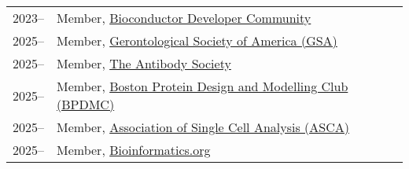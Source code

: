 \begin{longtable}[l]{@{}p{} p{}}

    2023-- & Member, \href{https://www.bioconductor.org/developers/}{Bioconductor Developer Community} \\

    2025-- & Member, \href{https://www.geron.org}{Gerontological Society of America (GSA)} \\

    2025-- & Member, \href{https://www.antibodysociety.org/}{The Antibody Society} \\

    2025-- & Member, \href{https://www.bpdmc.org/}{Boston Protein Design and Modelling Club (BPDMC)} \\

    2025-- & Member, \href{https://ascanet.org/}{Association of Single Cell Analysis (ASCA)} \\

    2025-- & Member, \href{https://www.bioinformatics.org/}{Bioinformatics.org} \\

\end{longtable}
